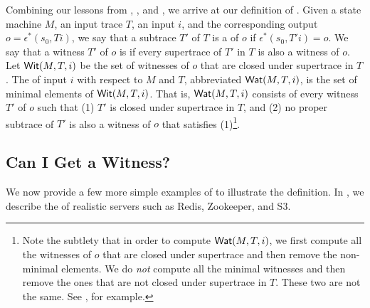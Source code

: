 Combining our lessons from ,
, and , we arrive
at our definition of \watprovenance{}. Given a state machine $M$, an input
trace $T$, an input $i$, and the corresponding output $o = \epsilon^*(s_0,
Ti)$, we say that a subtrace $T'$ of $T$ is a  of $o$ if
$\epsilon^*(s_0, T'i) = o$. We say that a witness $T'$ of $o$ is
 if every supertrace of $T'$ in $T$ is
also a witness of $o$. Let $\textsf{Wit}(M, T, i)$ be the set of witnesses of $o$ that
are closed under supertrace in $T$. The  of input $i$
with respect to $M$ and $T$, abbreviated $\textsf{Wat}(M, T, i)$, is the set of minimal
elements of $\textsf{Wit}(M, T, i)$. That is, $\textsf{Wat}(M, T, i)$ consists of every witness
$T'$ of $o$ such that (1) $T'$ is closed under supertrace in $T$, and (2) no
proper subtrace of $T'$ is also a witness of $o$ that satisfies (1)\footnote{%
  Note the subtlety that in order to compute $\textsf{Wat}(M, T, i)$, we first compute
  all the witnesses of $o$ that are closed under supertrace and then remove the
  non-minimal elements. We do \emph{not} compute all the minimal witnesses and
  then remove the ones that are not closed under supertrace in $T$. These two
  are not the same. See , for example.
}.

\subsection{Can I Get a Witness?}
We now provide a few more simple examples of \watprovenance{} to illustrate the
definition. In , we describe the \watprovenance{} of
realistic servers such as Redis, Zookeeper, and S3.


